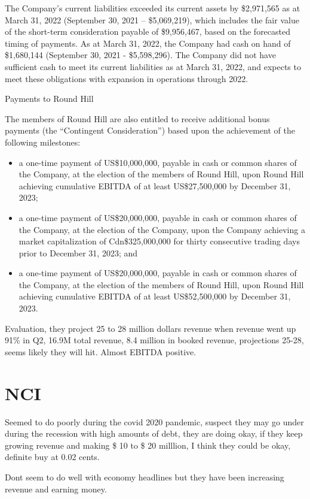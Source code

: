 The Company’s current liabilities exceeded its current assets by \$2,971,565 as at March 31, 2022
(September 30, 2021 – \$5,069,219), which includes the fair value of the short-term consideration payable of
\$9,956,467, based on the forecasted timing of payments. As at March 31, 2022, the Company had cash on
hand of \$1,680,144 (September 30, 2021 - \$5,598,296). The Company did not have sufficient cash to meet
its current liabilities as at March 31, 2022, and expects to meet these obligations with expansion in operations through 2022.

Payments to Round Hill

The members of Round Hill are also entitled to receive additional bonus payments (the “Contingent
Consideration”) based upon the achievement of the following milestones:
\begin{itemize}
\item a one-time payment of US\$10,000,000, payable in cash or common shares of the Company, at the
election of the members of Round Hill, upon Round Hill achieving cumulative EBITDA of at least
US\$27,500,000 by December 31, 2023;
\item a one-time payment of US\$20,000,000, payable in cash or common shares of the Company, at the
election of the Company, upon the Company achieving a market capitalization of Cdn\$325,000,000
for thirty consecutive trading days prior to December 31, 2023; and
\item a one-time payment of US\$20,000,000, payable in cash or common shares of the Company, at the
election of the members of Round Hill, upon Round Hill achieving cumulative EBITDA of at least
US\$52,500,000 by December 31, 2023.
\end{itemize}


Evaluation, they project 25 to 28 million dollars revenue when revenue went up 91\% in Q2, 16.9M total revenue, 8.4 million in booked revenue, projections 25-28, seems likely they will hit. Almost EBITDA positive.


\section{NCI}

Seemed to do poorly during the covid 2020 pandemic, suspect they may go under during the recession with high amounts of debt, they are doing okay, if they keep growing revenue and making \$ 10 to \$ 20 milllion, I think they could be okay, definite buy at 0.02 cents.

Dont seem to do well with economy headlines but they have been increasing revenue and earning money.

